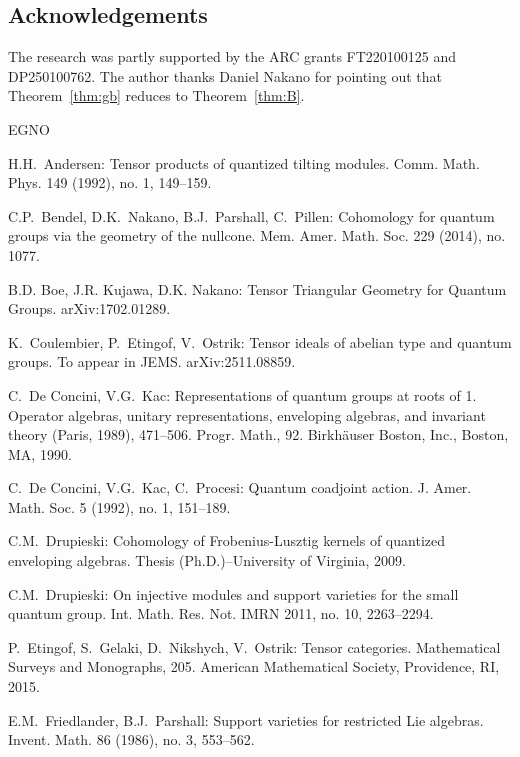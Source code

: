 \documentclass{amsart}
\numberwithin{equation}{section}
\theoremstyle{definition}
\theoremstyle{remark}
\begin{document}
\subsection*{Acknowledgements}
 The research was partly supported by the ARC grants FT220100125 and DP250100762. The author thanks Daniel Nakano for pointing out that Theorem~\ref{thm:gb} reduces \cite[Conjecture~5.3.3]{CEO} to Theorem~\ref{thm:B}.

\begin{thebibliography}
	{EGNO}
	
	
	
	
	 H.H.~Andersen: 
Tensor products of quantized tilting modules.
Comm. Math. Phys.   149 (1992), no. 1, 149--159.

 C.P.~Bendel, D.K.~Nakano, B.J.~Parshall, C.~Pillen:
Cohomology for quantum groups via the geometry of the nullcone.
Mem. Amer. Math. Soc. 229 (2014), no. 1077.
	
	
	 B.D. Boe, J.R. Kujawa, D.K. Nakano: Tensor Triangular Geometry for Quantum Groups.
arXiv:1702.01289.

	
 K.~Coulembier, P.~Etingof, V.~Ostrik: Tensor ideals of abelian type and quantum groups. To appear in JEMS.	arXiv:2511.08859.




 C.~De Concini, V.G.~Kac:
Representations of quantum groups at roots of 1. Operator algebras, unitary representations, enveloping algebras, and invariant theory (Paris, 1989), 471--506.
Progr. Math., 92.
Birkhäuser Boston, Inc., Boston, MA, 1990.


 C.~De Concini, V.G.~Kac, C.~Procesi:
Quantum coadjoint action.
J. Amer. Math. Soc. 5 (1992), no. 1, 151--189.


 C.M.~Drupieski:
Cohomology of Frobenius-Lusztig kernels of quantized enveloping algebras.
Thesis (Ph.D.)–University of Virginia, 2009. 

 C.M.~Drupieski:
On injective modules and support varieties for the small quantum group.
Int. Math. Res. Not. IMRN 2011, no. 10, 2263--2294.


P.~Etingof, S.~Gelaki, D.~Nikshych, V.~Ostrik:
Tensor categories. 
Mathematical Surveys and Monographs, 205. American Mathematical Society, Providence, RI, 2015. 


 E.M.~Friedlander, B.J.~Parshall:
Support varieties for restricted Lie algebras.
Invent. Math. 86 (1986), no. 3, 553--562.



\end{thebibliography}
\end{document}

